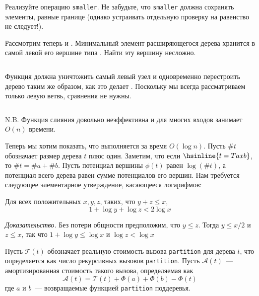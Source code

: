 \begin{frame}[fragile]{}
\begin{exercise}\label{ex:5.4}
  Реализуйте операцию \lstinline!smaller!. Не забудьте, что
  \lstinline!smaller! должна сохранять элементы, равные границе (однако
  устраивать отдельную проверку на равенство не следует!).
\end{exercise}

\end{frame}

\begin{frame}[fragile]{}

Рассмотрим теперь  и
. Минимальный элемент расширяющегося дерева
хранится в самой левой его вершине типа . Найти эту
вершину несложно.
\inputminted[firstline=42,lastline=44,gobble=2] {haskell}{code/SplayHeap.lhs}

Функция  должна уничтожить самый левый узел и
одновременно перестроить дерево таким же образом, как это делает
. Поскольку мы всегда рассматриваем только левую
ветвь, сравнения не нужны.
\inputminted[firstline=46,lastline=49,gobble=2] {haskell}{code/SplayHeap.lhs}

N.B. Функция слияния
 довольно неэффективна и для многих входов
занимает $O(n)$ времени.


\end{frame}

\begin{frame}[fragile]{}
Теперь мы хотим показать, что  выполняется за время
$O(\log n)$. Пусть $\#t$ обозначает размер дерева $t$ плюс
один. Заметим, что если $\hsinline{t = T a x b}$, то $\#t =
\#a + \#b$. Пусть потенциал вершины $\phi(t)$ равен $\log(\# t)$, а
потенциал всего дерева равен сумме потенциалов его вершин. Нам
требуется следующее элементарное утверждение, касающееся логарифмов:
\begin{lemma}\label{lm:5.1}
  Для всех положительных $x, y, z$, таких, что $y + z \le x$,
  $$
  1 + \log y + \log z < 2 \log x
  $$
  
  \noindent
  \textit{Доказательство.} Без потери общности предположим, что $y \le  z$.
  Тогда $y \le x/2$ и $z \le x$, так что $1 + \log y \le \log x$ и
  $\log z < \log x$
\end{lemma}

\end{frame}

\begin{frame}[fragile]{}

Пусть $\mathcal{T}(t)$ обозначает реальную стоимость вызова
\lstinline!partition! для дерева $t$, что определяется как число
рекурсивных вызовов \lstinline!partition!. Пусть $\mathcal{A}(t)$~---
амортизированная стоимость такого вызова, определяемая как
$$
\mathcal{A}(t) = \mathcal{T}(t) + \Phi(a) + \Phi(b) - \Phi(t)
$$
где $a$ и $b$~--- возвращаемые функцией \lstinline!partition!
поддеревья.

\end{frame}


